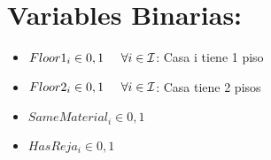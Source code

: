 \documentclass{article}
\begin{document}
\section{Variables Binarias:}
\begin{itemize}

    \item $Floor1_{i} \in 0,1 \hspace{5mm} \forall i \in \mathcal{I}$: Casa i tiene 1 piso
    \item $Floor2_{i} \in 0,1 \hspace{5mm} \forall i \in \mathcal{I}$: Casa tiene 2 pisos
    \item $SameMaterial_{i} \in 0,1$
    \item $HasReja_{i} \in 0,1$

\end{itemize}
\end{document}
